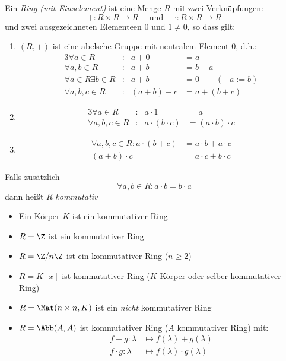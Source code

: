 \documentclass[a4paper, 10pt]{scrbook}
\begin{document}
\begin{df}
\label{df:10.8}
Ein \emph{Ring (mit Einselement)} ist eine Menge $R$ mit zwei Verknüpfungen:
\[
+:R\times R\to R \quad \text{ und }\quad  \cdot:R\times R\to R
\]
und zwei ausgezeichneten Elementeen $0$ und $1\neq 0$, so dass gilt:
\begin{enumerate}[({R}1)]
\item
$(R,+)$ ist eine abelsche Gruppe mit neutralem Element $0$, d.h.:
\begin{alignat*}{3}
	\forall a\in R&: &a+0&=a\\
\forall a,b\in R&: &a+b&=b+a\\
\forall a\in R\exists b\in R&: &a+b&=0 \qquad (-a:=b) \\
					  \forall a,b,c\in R&:&(a+b)+c&=a+(b+c)
\end{alignat*}
\item
	\begin{alignat*}{3}
		\forall a\in R&:&a\cdot 1&=a\\
\forall a,b,c\in R&:&a\cdot(b\cdot c)&=(a\cdot b)\cdot c
\end{alignat*}
\item
\begin{align*}
\forall a,b,c\in R: a\cdot(b+c)&=a\cdot b + a\cdot c\\
(a+b)\cdot c&=a\cdot c+b\cdot c
\end{align*}
\end{enumerate}
Falls zusätzlich
\[
\forall a,b\in R: a\cdot b=b\cdot a
\]
dann heißt $R$ \emph{kommutativ}
\end{df}

\begin{ex}
\begin{itemize}
\item
Ein Körper $K$ ist ein kommutativer Ring
\item
$R=\Z$ ist ein kommutativer Ring
\item
$R=\Z/n\Z$ ist ein kommutativer Ring ($n\ge 2$)
\item
$R=K[x]$ ist kommutativer Ring ($K$ Körper oder selber kommutativer Ring)
\item
$R=\Mat(n\times n, K)$ ist ein \emph{nicht} kommutativer Ring
\item
$R=\Abb(A,A)$ ist kommutativer Ring ($A$ kommutativer Ring) mit:
\begin{align*}
f+g:\lambda &\mapsto f(\lambda) +g(\lambda)\\
f\cdot g :\lambda &\mapsto f(\lambda) \cdot g(\lambda)
\end{align*}
\end{itemize}
\end{ex}
\end{document}
